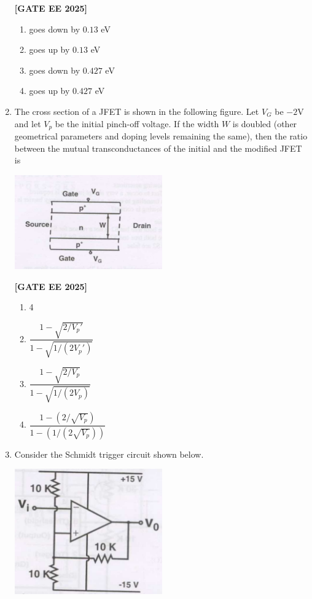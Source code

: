 \documentclass[12pt]{article}
\begin{document}
\begin{enumerate}[leftmargin=*, label=\textbf{Q.\arabic*:}]
\noindent \textbf{[GATE EE 2025]}
\begin{enumerate}[label=(\Alph*)]
    \item goes down by $0.13$ eV
    \item goes up by $0.13$ eV
    \item goes down by $0.427$ eV
    \item goes up by $0.427$ eV
\end{enumerate}

\item The cross section of a JFET is shown in the following figure. Let $V_G$ be $-2$V and let $V_p$ be the initial pinch-off voltage. If the width $W$ is doubled (other geometrical parameters and doping levels remaining the same), then the ratio between the mutual transconductances of the initial and the modified JFET is

\begin{center}
\includegraphics[width=0.5\textwidth]{figs/q52.png}
\end{center}
 
\noindent \textbf{[GATE EE 2025]}
\begin{enumerate}[label=(\Alph*)]
    \item 4
    \item $\dfrac{1 - \sqrt{2/V_p'}}{1 - \sqrt{1/(2V_p')}}$
    \item $\dfrac{1 - \sqrt{2/V_p}}{1 - \sqrt{1/(2V_p)}}$
    \item $\dfrac{1 - (2/\sqrt{V_p})}{1 - (1/(2\sqrt{V_p}))}$
\end{enumerate}

\item Consider the Schmidt trigger circuit shown below.

\begin{center}
\includegraphics[width=0.5\textwidth]{figs/q53.png}
\end{center}


\end{enumerate}
\end{document}
